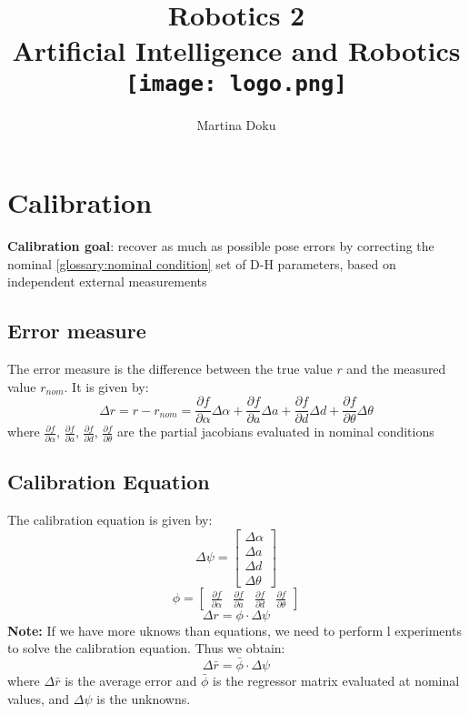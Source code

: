 \documentclass[a4paper,12pt]{article}
\title{
    \Huge{Robotics 2}\\
    \large{Artificial Intelligence and Robotics}\\
    \vspace{1cm}
    \texttt{[image: logo.png]}
}
\author{Martina Doku}
\begin{document}
\maketitle
\newpage

\tableofcontents
\newpage

\section{Calibration}
\textbf{Calibration goal}:  recover as 
much as possible pose
errors by correcting the nominal \ref{glossary:nominal condition}
set of D-H parameters,
based on independent external measurements
\subsection{Error measure}
The error measure is the difference between the true value $r$ and the
 measured value $r_{nom}$. It is given by:
\begin{equation}
  \Delta r = r - r_{nom} = \frac{\partial f}{\partial \alpha} \Delta \alpha + \frac{\partial f}{\partial a} \Delta a + \frac{\partial f}{\partial d} \Delta d + \frac{\partial f}{\partial \theta} \Delta \theta
\end{equation}
where $\frac{\partial f}{\partial \alpha}$, $\frac{\partial f}{\partial a}$, $\frac{\partial f}{\partial d}$, $\frac{\partial f}{\partial \theta}$ are the partial 
jacobians evaluated in nominal conditions
\subsection{Calibration Equation}
The calibration equation is given by:
\begin{equation}
    \Delta \psi = \begin{bmatrix}
        \Delta \alpha \\
        \Delta a \\
        \Delta d \\
        \Delta \theta
    \end{bmatrix}
\end{equation}
\begin{equation}
    \phi= \begin{bmatrix}
     \frac{\partial f}{\partial \alpha} & \frac{\partial f}{\partial a} & \frac{\partial f}{\partial d} & \frac{\partial f}{\partial \theta}
    \end{bmatrix}
\end{equation}
\begin{equation}
    \Delta r= \phi \cdot \Delta \psi
\end{equation}
\textbf{Note:} If we have more uknows than equations, we need to perform 
l experiments to solve the calibration equation. Thus we obtain:
\begin{equation}
    \Delta \bar{r}= \bar{\phi} \cdot \Delta \psi
\end{equation}
where $\Delta \bar{r}$ is the average error 
and $\bar{\phi}$ is the regressor matrix evaluated at nominal values,
and $\Delta \psi$ is the unknowns.
\end{document}
